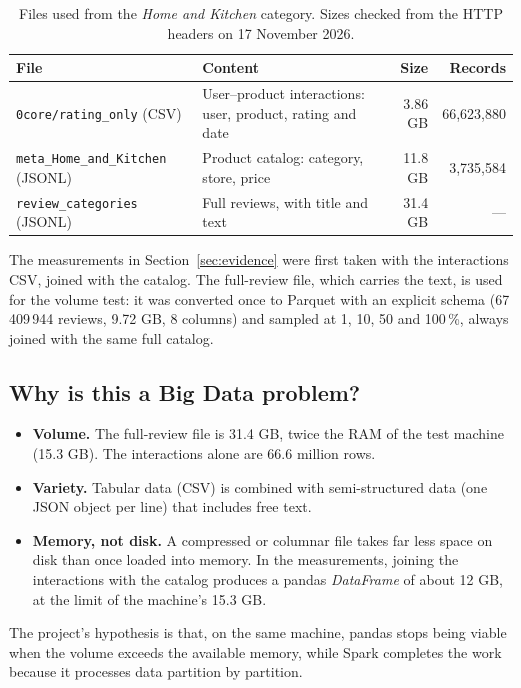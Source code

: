 \documentclass[11pt,a4paper]{article}
\begin{document}
\begin{table}[H]
\centering
\caption{Files used from the \emph{Home and Kitchen} category. Sizes checked from the HTTP
headers on 17 November 2026.}
\label{tab:data}
\begin{tabularx}{\textwidth}{lXrr}
\toprule
File & Content & Size & Records \\
\midrule
\texttt{0core/rating\_only} (CSV) & User--product interactions: user, product, rating and date & 3.86 GB & 66,623,880 \\
\texttt{meta\_Home\_and\_Kitchen} (JSONL) & Product catalog: category, store, price & 11.8 GB & 3,735,584 \\
\texttt{review\_categories} (JSONL) & Full reviews, with title and text & 31.4 GB & --- \\
\bottomrule
\end{tabularx}
\end{table}

The measurements in Section~\ref{sec:evidence} were first taken with the interactions CSV,
joined with the catalog. The full-review file, which carries the text, is used for the
volume test: it was converted once to Parquet with an explicit schema (67\,409\,944
reviews, 9.72 GB, 8 columns) and sampled at 1, 10, 50 and 100\,\%, always joined with the
same full catalog.

\subsection{Why is this a Big Data problem?}

\begin{itemize}
  \item \textbf{Volume.} The full-review file is 31.4 GB, twice the RAM of the test machine
  (15.3 GB). The interactions alone are 66.6 million rows.
  \item \textbf{Variety.} Tabular data (CSV) is combined with semi-structured data (one JSON
  object per line) that includes free text.
  \item \textbf{Memory, not disk.} A compressed or columnar file takes far less space on disk
  than once loaded into memory. In the measurements, joining the interactions with the
  catalog produces a pandas \emph{DataFrame} of about 12 GB, at the limit of the machine's
  15.3 GB.
\end{itemize}

The project's hypothesis is that, on the same machine, pandas stops being viable when the
volume exceeds the available memory, while Spark completes the work because it processes
data partition by partition.
\end{document}
